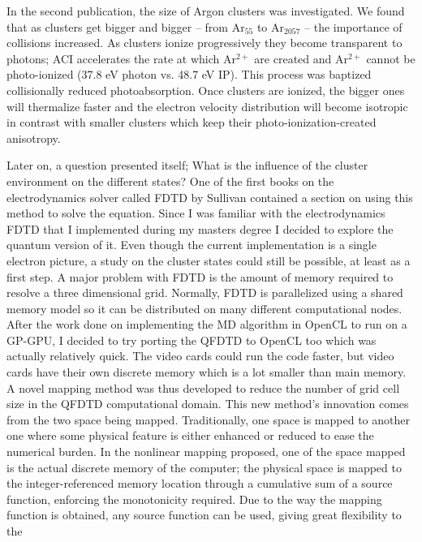 In the second publication, the size of Argon clusters was investigated. We found
that as clusters get bigger and bigger -- from Ar$_{55}$ to Ar$_{2057}$ --
the importance of collisions increased. As clusters ionize progressively they
become transparent to photons; ACI accelerates the rate at which Ar$^{2+}$ are
created and Ar$^{2+}$ cannot be photo-ionized (37.8 eV photon vs. 48.7 eV IP).
This process was baptized collisionally reduced photoabsorption. Once clusters
are ionized, the bigger ones will thermalize faster and the electron velocity
distribution will become isotropic in contrast with smaller clusters which
keep their photo-ionization-created anisotropy.


Later on, a question presented itself; What is the influence of the cluster
environment on the different states? One of the first books on the
electrodynamics solver called FDTD by Sullivan contained a section on using
this method to solve the \schrodinger equation. Since I was familiar with
the electrodynamics FDTD that I implemented during my masters degree I decided
to explore the quantum version of it. Even though the current implementation is
a single electron picture, a study on the cluster states could still be possible,
at least as a first step. A major problem with FDTD is the amount of memory
required to resolve a three dimensional grid. Normally, FDTD is parallelized
using a shared memory model so it can be distributed on many different
computational nodes. After the work done on implementing the MD algorithm in
OpenCL to run on a GP-GPU, I decided to try porting the QFDTD to OpenCL too
which was actually relatively quick. The video cards could run the code faster,
but video cards have their own discrete memory which is a lot smaller than main
memory. A novel mapping method was thus developed to reduce the number of grid
cell size in the QFDTD computational domain. This new method's innovation comes
from the two space being mapped. Traditionally, one space is mapped to another
one where some physical feature is either enhanced or reduced to ease the numerical
burden. In the nonlinear mapping proposed, one of the space mapped is the actual
discrete memory of the computer; the physical space is mapped to the
integer-referenced memory location through a cumulative sum of a source function,
enforcing the monotonicity required. Due to the way the mapping function is
obtained, any source function can be used, giving great flexibility to the
